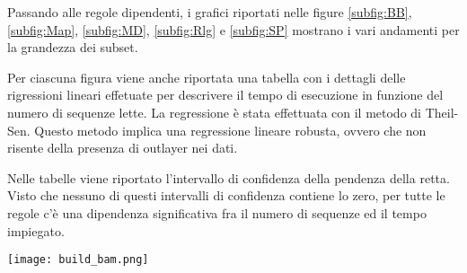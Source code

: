 Passando alle regole dipendenti, i grafici riportati nelle figure \ref{subfig:BB}, \ref{subfig:Map}, \ref{subfig:MD}, \ref{subfig:Rlg} e \ref{subfig:SP} mostrano i vari andamenti per la grandezza dei subset.

Per ciascuna figura viene anche riportata una tabella con i dettagli delle rigressioni lineari effetuate per descrivere il tempo di esecuzione in funzione del numero di sequenze lette.
La regressione è stata effettuata con il metodo di Theil-Sen.
Questo metodo implica una regressione lineare robusta, ovvero che non risente della presenza di outlayer nei dati.

Nelle tabelle viene riportato l'intervallo di confidenza della pendenza della retta.
Visto che nessuno di questi intervalli di confidenza contiene lo zero, per tutte le regole c'è una dipendenza significativa fra il numero di sequenze ed il tempo impiegato.

\begin{table}[H]
  \begin{minipage}[b]{0.4\linewidth}
	\centering
	\texttt{[image: build\_bam.png]}
	\label{subfig:BB}
  \end{minipage}
  \hfill 
  \begin{varwidth}[b]{0.4\linewidth}
    \centering
    \caption{Dettagli retta di fit per Build BAM.}
    \label{tab:Bb}
  \end{varwidth}%
\end{table}


